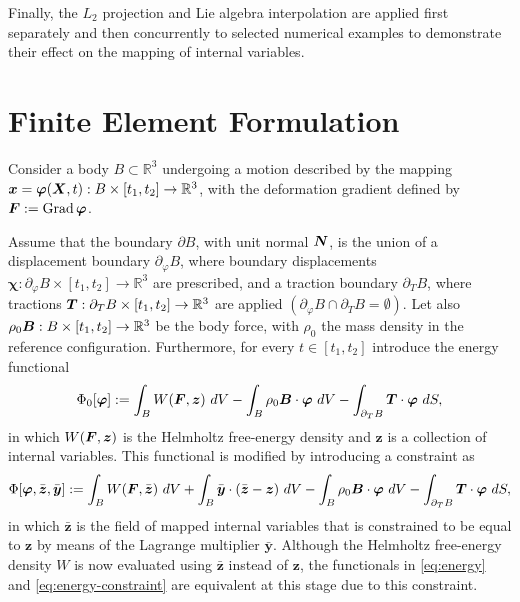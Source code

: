 \documentclass[12pt]{article}
\newcommand{\mbs}[1]{\boldsymbol{#1}}
\newcommand{\mbb}[1]{\mathbb{#1}}
\def\by{{\mbs{y}}} \def\bz{{\mbs{z}}}
\def\bvarphi{{\mbs{\varphi}}}
\def\bchi{{\mbs{\chi}}}
\DeclareMathOperator{\Grad}{Grad}
\begin{document}
Finally, the $L_2$ projection and Lie algebra interpolation are applied first
separately and then concurrently to selected numerical examples to demonstrate
their effect on the mapping of internal variables.


\section{Finite Element Formulation}
\label{sec:FE-formulation}

Consider a body $B\subset\mbb{R}^3$ undergoing a motion described by
the mapping $\bx = \bvarphi(\bX, t): B\times[t_1, t_2]\rightarrow
\mbb{R}^3$, with the deformation gradient defined by $\bF := \Grad
\bvarphi$.

Assume that the boundary $\partial B$, with unit normal $\bN$, is the
union of a displacement boundary $\partial_{\varphi} B$, where
boundary displacements $\bchi : \partial_{\varphi} B\times[t_1,
t_2]\rightarrow \mbb{R}^3$ are prescribed, and a traction boundary
$\partial_T B$, where tractions $\bT: \partial_T B \times[t_1,
t_2]\rightarrow \mbb{R}^3$ are applied $(\partial_{\varphi} B \cap
\partial_T B = \emptyset)$. Let also $\rho_0 \bB: B \times [t_1,
t_2]\rightarrow \mbb{R}^3$ be the body force, with $\rho_0$ the mass
density in the reference configuration.  Furthermore, for every $t \in
[t_1, t_2]$ introduce the energy functional
\begin{equation}\label{eq:energy}
  \Phi_0[ \bvarphi ] :=
  \int_B W(\bF, \bz) \ dV
  -
  \int_B \rho_0 \bB \cdot \bvarphi \ dV
  -
  \int_{\partial_T B} \bT \cdot \bvarphi \ dS,
\end{equation}
in which $W(\bF, \bz)$ is the Helmholtz free-energy density and $\bz$
is a collection of internal variables. This functional is modified by
introducing a constraint as
\begin{equation}\label{eq:energy-constraint}
  \Phi[ \bvarphi, \bar{\bz}, \bar{\by} ] :=
  \int_B W(\bF, \bar{\bz}) \ dV
  +
  \int_B \bar{\by} \cdot (\bar{\bz} - \bz) \ dV
  -
  \int_B \rho_0 \bB \cdot \bvarphi \ dV
  -
  \int_{\partial_T B} \bT \cdot \bvarphi \ dS,
\end{equation}
in which $\bar{\bz}$ is the field of mapped internal variables that is
constrained to be equal to $\bz$ by means of the Lagrange multiplier
$\bar{\by}$. Although the Helmholtz free-energy density $W$ is now
evaluated using $\bar{\bz}$ instead of $\bz$, the functionals in
\eqref{eq:energy} and \eqref{eq:energy-constraint} are equivalent at
this stage due to this constraint.
\end{document}
